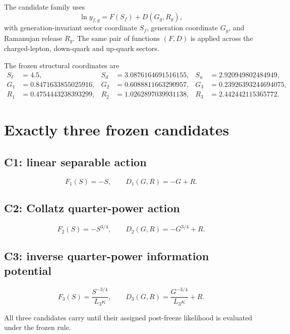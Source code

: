 The candidate family uses
\begin{equation}
\boxed{
\ln y_{f,g}=F(S_f)+D(G_g,R_g),
}
\label{eq:v12_prospective_separable}
\end{equation}
with generation-invariant sector coordinate $S_f$, generation coordinate $G_g$, and Ramanujan release $R_g$. The same pair of functions $(F,D)$ is applied across the charged-lepton, down-quark and up-quark sectors.

The frozen structural coordinates are
\begin{align}
S_\ell&=4.5,
&S_d&=3.0876164691516155,
&S_u&=2.920949802484949,\\
G_1&=0.8471633855025916,
&G_2&=0.6088811663290957,
&G_3&=0.23926393244694075,\\
R_1&=0.4754443238393299,
&R_2&=1.0262897039931138,
&R_3&=2.442442115365772.
\end{align}

\section{Exactly three frozen candidates}

\subsection{C1: linear separable action}
\begin{equation}
F_1(S)=-S,
\qquad
D_1(G,R)=-G+R.
\end{equation}

\subsection{C2: Collatz quarter-power action}
\begin{equation}
F_2(S)=-S^{3/4},
\qquad
D_2(G,R)=-G^{3/4}+R.
\end{equation}

\subsection{C3: inverse quarter-power information potential}
\begin{equation}
F_3(S)=\frac{S^{-3/4}}{L_3\kappa},
\qquad
D_3(G,R)=\frac{G^{-3/4}}{L_3\kappa}+R.
\end{equation}

All three candidates carry
until their assigned post-freeze likelihood is evaluated under the frozen rule.


